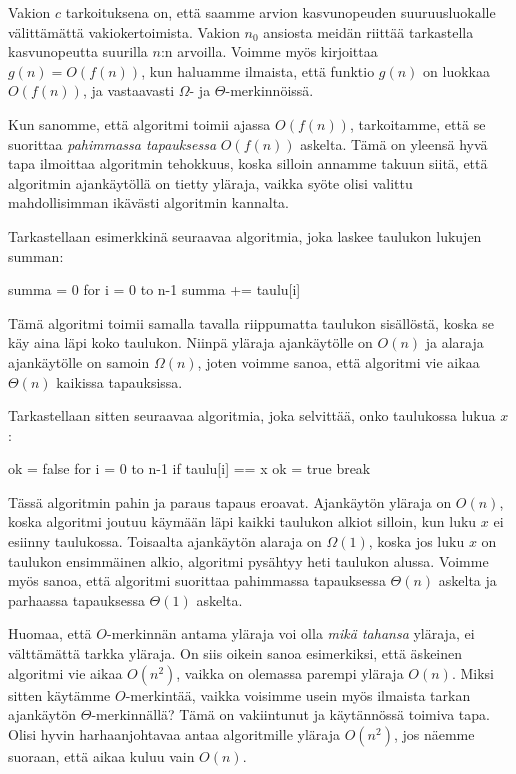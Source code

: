 Vakion $c$ tarkoituksena on, että saamme arvion kasvunopeuden suuruusluokalle välittämättä
vakiokertoimista. Vakion $n_0$ ansiosta meidän riittää tarkastella
kasvunopeutta suurilla $n$:n arvoilla.
Voimme myös kirjoittaa $g(n)=O(f(n))$, kun haluamme ilmaista,
että funktio $g(n)$ on luokkaa $O(f(n))$,
ja vastaavasti $\Omega$- ja $\Theta$-merkinnöissä.

Kun sanomme, että algoritmi toimii ajassa $O(f(n))$, tarkoitamme, että se suorittaa
\emph{pahimmassa tapauksessa} $O(f(n))$ askelta.
Tämä on yleensä hyvä tapa ilmoittaa algoritmin tehokkuus,
koska silloin annamme takuun siitä, että algoritmin ajankäytöllä on tietty yläraja,
vaikka syöte olisi valittu mahdollisimman ikävästi algoritmin kannalta.

Tarkastellaan esimerkkinä seuraavaa algoritmia, joka laskee
taulukon lukujen summan:

\begin{code}
summa = 0
for i = 0 to n-1
    summa += taulu[i]
\end{code}

Tämä algoritmi toimii samalla tavalla riippumatta taulukon sisällöstä,
koska se käy aina läpi koko taulukon.
Niinpä yläraja ajankäytölle on $O(n)$ ja alaraja ajankäytölle on samoin $\Omega(n)$,
joten voimme sanoa, että algoritmi vie aikaa $\Theta(n)$ kaikissa tapauksissa.

Tarkastellaan sitten seuraavaa algoritmia, joka selvittää,
onko taulukossa lukua $x$:

\begin{code}
ok = false
for i = 0 to n-1
    if taulu[i] == x
        ok = true
        break
\end{code}

Tässä algoritmin pahin ja paraus tapaus eroavat.
Ajankäytön yläraja on $O(n)$, koska algoritmi joutuu käymään
läpi kaikki taulukon alkiot silloin, kun luku $x$
ei esiinny taulukossa.
Toisaalta ajankäytön alaraja on $\Omega(1)$,
koska jos luku $x$ on taulukon ensimmäinen alkio,
algoritmi pysähtyy heti taulukon alussa.
Voimme myös sanoa, että algoritmi suorittaa pahimmassa
tapauksessa $\Theta(n)$ askelta ja parhaassa tapauksessa
$\Theta(1)$ askelta.

Huomaa, että $O$-merkinnän antama yläraja voi olla
\emph{mikä tahansa} yläraja, ei välttämättä tarkka yläraja.
On siis oikein sanoa esimerkiksi, että äskeinen
algoritmi vie aikaa $O(n^2)$, vaikka on olemassa parempi yläraja $O(n)$.
Miksi sitten käytämme $O$-merkintää, vaikka voisimme usein myös ilmaista tarkan
ajankäytön $\Theta$-merkinnällä?
Tämä on vakiintunut ja käytännössä toimiva tapa.
Olisi hyvin harhaanjohtavaa antaa algoritmille yläraja $O(n^2)$,
jos näemme suoraan, että aikaa kuluu vain $O(n)$.

